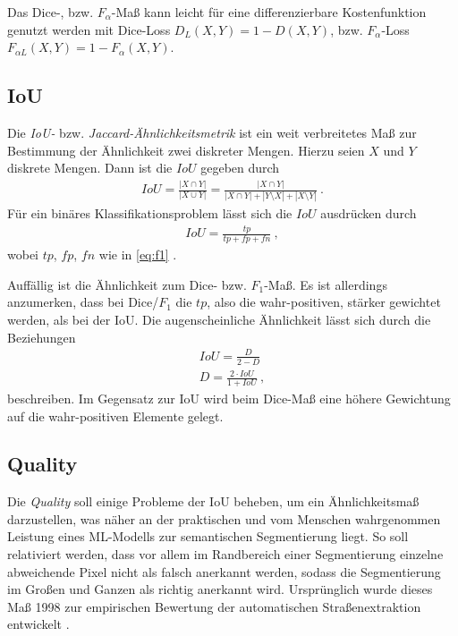 Das Dice-, bzw. $F_{\alpha}$-Maß kann leicht für eine differenzierbare Kostenfunktion genutzt werden mit Dice-Loss $D_{L}(X, Y) = 1 - D(X,Y)$, bzw. $F_{\alpha}$-Loss $F_{\alpha L}(X,Y) = 1 - F_{\alpha}(X,Y)$. 


\subsection{\acf{IoU}}

Die \textit{\acf{IoU}-} bzw. \textit{Jaccard-Ähnlichkeitsmetrik} ist ein weit verbreitetes Maß zur Bestimmung der Ähnlichkeit zwei diskreter Mengen. Hierzu seien $X$ und $Y$ diskrete Mengen. Dann ist die $IoU$ gegeben durch 
\begin{align}
	\label{eq:iou} IoU = \frac{|X\cap Y|}{|X \cup Y|} = \frac{| X \cap Y |}{| X \cap Y | + |Y \setminus X| + |X \setminus Y|}~.
\end{align} 
Für ein binäres Klassifikationsproblem lässt sich die $IoU$ ausdrücken durch 
\begin{align}
	\label{eq:iou-binary} IoU = \frac{tp}{tp + fp + fn}~,
\end{align}
wobei $tp$, $fp$, $fn$ wie in \autoref{eq:f1} \cite{Fletcher.2018}. 

Auffällig ist die Ähnlichkeit zum Dice- bzw. $F_{1}$-Maß. Es ist allerdings anzumerken, dass bei Dice/$F_1$ die $tp$, also die wahr-positiven, stärker gewichtet werden, als bei der \ac{IoU}. Die augenscheinliche Ähnlichkeit lässt sich durch die Beziehungen
\begin{align}
	\label{eq:dice-iou} IoU = \frac{D}{2 - D} \\
	D = \frac{2 \cdot IoU}{1 + IoU} ~,
\end{align}
beschreiben.
Im Gegensatz zur \ac{IoU} wird beim Dice-Maß eine höhere Gewichtung auf die wahr-positiven Elemente 
gelegt.

\subsection{Quality} \label{sec:evaluation-metrics:quality}

Die \textit{Quality} soll einige Probleme der \ac{IoU} beheben, um ein Ähnlichkeitsmaß darzustellen, 
was näher an der praktischen und vom Menschen wahrgenommen Leistung eines \ac{ML}-Modells zur semantischen Segmentierung liegt.
So soll relativiert werden, dass vor allem im Randbereich einer Segmentierung einzelne abweichende Pixel
nicht als falsch anerkannt werden, sodass die Segmentierung im Großen und Ganzen als richtig anerkannt wird. 
Ursprünglich wurde dieses Maß 1998 zur empirischen Bewertung der automatischen Straßenextraktion entwickelt \cite{ChristianWiedemann.1998}. 

